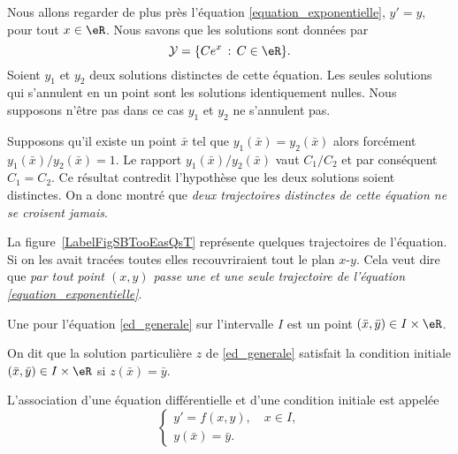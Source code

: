 \begin{example}
	Nous allons regarder de plus près l'équation \eqref{equation_exponentielle}, \( y'=y\), pour tout \( x\in\eR\). Nous savons que les solutions sont données par
	\begin{equation}
		\mathcal{Y} = \{Ce^x\, : \, C\in\eR\}.
	\end{equation}
	Soient \( y_1\) et \( y_2\) deux solutions distinctes de cette équation. Les seules solutions qui s'annulent en un point sont les solutions identiquement nulles. Nous supposons n'être pas dans ce cas \( y_1\) et \( y_2\) ne s'annulent pas.

	Supposons qu'il existe un point \( \bar x\) tel que \( y_1(\bar x) = y_2 (\bar x)\) alors forcément \( y_1(\bar x)/y_2 (\bar x)=1\). Le rapport \( y_1(\bar x)/y_2 (\bar x)\) vaut \( C_1/C_2\) et par conséquent \( C_1 = C_2\). Ce résultat contredit l'hypothèse que les deux solutions soient distinctes. On a donc montré que \emph{deux trajectoires distinctes de cette équation ne se croisent jamais}.

	\newcommand{\CaptionFigSBTooEasQsT}{Quelques trajectoires de l'équation \( y'=y\).}
	

	La figure~\ref{LabelFigSBTooEasQsT} représente quelques trajectoires de l'équation. Si on les avait tracées toutes elles recouvriraient tout le plan \( x\)-\( y\). Cela veut dire que \emph{par tout point \( (x,y)\) passe une et une seule trajectoire de l'équation \eqref{equation_exponentielle}}.

\end{example}
\begin{definition}
	Une  pour l'équation \eqref{ed_generale} sur l'intervalle \(I\) est un point \((\bar x, \bar y)\in I\times\eR\).

	On dit que la solution particulière \(z\) de \eqref{ed_generale} satisfait la condition initiale \((\bar x, \bar y)\in I\times\eR\) si \(z(\bar x) =\bar y\).
\end{definition}
\begin{definition}
	L'association d'une équation différentielle et d'une condition initiale est appelée 
	\begin{equation}\label{plme_cauchy}
		\begin{cases}
			y'= f(x,y), \quad x\in I, \\
			y(\bar x) = \bar y.
		\end{cases}
	\end{equation}
\end{definition}
